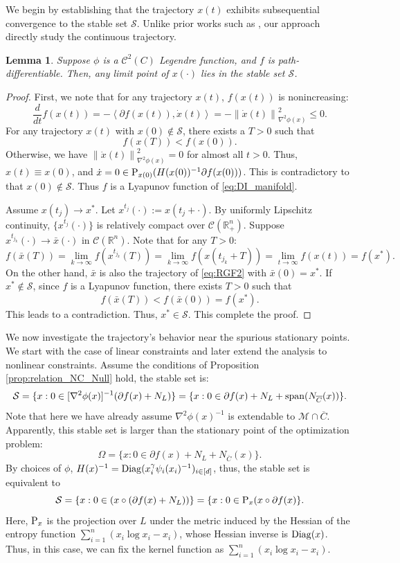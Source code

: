 \documentclass[11pt]{article}
\newcommand{\R}{\mathbb R}
\newcommand{\cC}{\mathcal C}
\newcommand{\cM}{\mathcal M}
\newcommand{\cS}{\mathcal S}
\def\norm#1{\left\|#1\right\|}
\def\inner#1{\left\langle#1\right\rangle}
\newtheorem{lemma}{Lemma}[section]
\begin{document}
We begin by establishing that the trajectory $ x(t) $ exhibits subsequential convergence to the stable set $ \mathcal{S} $. Unlike prior works such as \cite{duchi2018stochastic,davis2020stochastic,bolte2021conservative}, our approach directly study the continuous trajectory.
\begin{lemma}
Suppose $\phi$ is a $\cC^2({C})$ Legendre function, and $f$ is path-differentiable. Then, any limit point of $x(\cdot)$ lies in the stable set $\cS$.     
\end{lemma}
\begin{proof}
First, we note that for any trajectory $x(t)$, $f(x(t))$ is nonincreasing:
\[
\frac{d}{dt}f(x(t))=-\inner{\partial f(x(t)),\dot x(t)}=-\norm{\dot x(t)}^2_{\nabla^2\phi(x)}\leq0.
\]
For any trajectory $x(t)$ with $x(0)\notin\cS$, there exists a $T>0$ such that
\[
f(x(T))<f(x(0)).
\]
Otherwise, we have $\norm{\dot x(t)}^2_{\nabla^2\phi(x)}=0$ for almost all $t>0$. Thus, $x(t)\equiv x(0)$, and $\dot x=0\in{\rm P}_{x(0)}(H(x(0))^{-1}\partial f(x(0)))$. This is contradictory to that $x(0)\notin\cS$. Thus $f$ is a Lyapunov function of \eqref{eq:DI_manifold}.

Assume $x(t_j)\rightarrow x^*$. Let $x^{t_j}(\cdot):=x(t_j+\cdot)$. By uniformly Lipschitz continuity, $\{x^{t_j}(\cdot)\}$ is relatively compact over $\cC(\R^n_+)$. Suppose $x^{t_{j_k}}(\cdot)\rightarrow\bar x(\cdot)$ in $\cC(\R^n)$. Note that for any $T>0$:
\[
f(\bar x(T))=\lim_{k\rightarrow\infty}f(x^{t_{j_k}}(T))=\lim_{k\rightarrow\infty}f(x(t_{j_k}+T))=\lim_{t\rightarrow\infty}f(x(t))=f(x^*).
\]
On the other hand, $\bar x$ is also the trajectory of \eqref{eq:RGF2} with $\bar x(0)=x^*$. If $x^*\notin\cS$, since $f$ is a Lyapunov function, there exists $T>0$ such that
\[
f(\bar x(T))<f(\bar x(0))=f(x^*).
\]
This leads to a contradiction. Thus, $x^*\in\cS$. This complete the proof.
\end{proof}

We now investigate the trajectory's behavior near the spurious stationary points. We start with the case of linear constraints and later extend the analysis to nonlinear constraints. Assume the conditions of Proposition \ref{prop:relation_NC_Null} hold, the stable set is:
\[
\cS=\{x:0\in[\nabla^2\phi(x)]^{-1}(\partial f(x)+N_L)\}=\{x:0\in\partial f(x)+N_L+{\rm span}(N_{\overline C}(x))\}.
\]
Note that here we have already assume $\nabla^2\phi(x)^{-1}$ is extendable to $\cM\cap\overline{C}$.  Apparently, this stable set is larger than the stationary point of the optimization problem:
\[
\Omega=\{x:0\in\partial f(x)+N_L+N_{\overline C}(x)\}.
\]
By choices of $\phi$, $H(x)^{-1}={\rm Diag}(x_i^\gamma\psi_i(x_i)^{-1})_{i\in[d]}$, thus, the stable set is equivalent to 
\[
\cS=\{x:0\in(x\circ(\partial f(x)+N_L))\}=\{x:0\in {\rm P}_x(x\circ\partial f(x)\}.
\]
Here, ${\rm P}_x$ is the projection over $L$ under the metric induced by the Hessian of the entropy function $\sum_{i=1}^n(x_i\log x_i-x_i)$, whose Hessian inverse is ${\rm Diag}(x)$. Thus, in this case, we can fix the kernel function as $\sum_{i=1}^n(x_i\log x_i-x_i)$.
\end{document}
